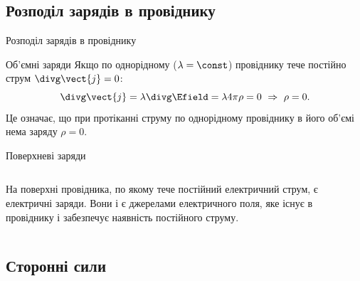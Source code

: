 \documentclass[onlytextwidth]{beamer}
\begin{document}
\subsection{Розподіл зарядів в провіднику}




\begin{frame}{Розподіл зарядів в провіднику}{}
	\begin{block}{Об'ємні заряди}\justifying
		Якщо по однорідному ($\lambda = \const$) провіднику тече постійно струм $\divg\vect{j} = 0$:
		\begin{equation*}
			\divg\vect{j} = \lambda\divg\Efield = \lambda 4\pi \rho = 0\ \Rightarrow\ \rho = 0.
		\end{equation*}
		Це означає, що при протіканні струму по однорідному провіднику в його об'ємі нема заряду $\rho
			= 0$.
	\end{block}

	\begin{block}{Поверхневі заряди}
		\begin{columns}
			\begin{column}{0.7\linewidth}\justifying
				На поверхні провідника, по якому тече постійний електричний струм, є електричні заряди.
				Вони і є джерелами електричного поля, яке існує в провіднику і забезпечує наявність
				постійного струму.
			\end{column}
			\hfill
			\begin{column}{0.25\linewidth}\centering
                
			\end{column}
		\end{columns}
	\end{block}
\end{frame}


\subsection{Сторонні сили}
\end{document}
